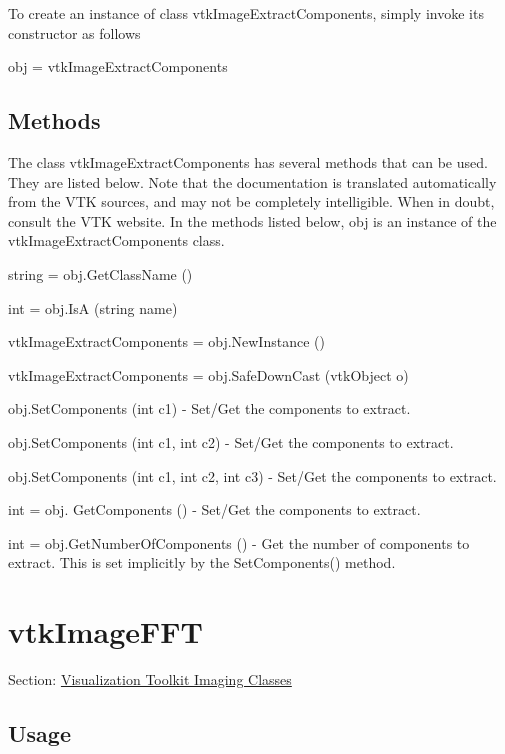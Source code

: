 To create an instance of class vtk\-Image\-Extract\-Components, simply invoke its constructor as follows \begin{DoxyVerb}  obj = vtkImageExtractComponents
\end{DoxyVerb}
 \hypertarget{vtkwidgets_vtkxyplotwidget_Methods}{}\subsection{Methods}\label{vtkwidgets_vtkxyplotwidget_Methods}
The class vtk\-Image\-Extract\-Components has several methods that can be used. They are listed below. Note that the documentation is translated automatically from the V\-T\-K sources, and may not be completely intelligible. When in doubt, consult the V\-T\-K website. In the methods listed below, {\ttfamily obj} is an instance of the vtk\-Image\-Extract\-Components class. 
\begin{DoxyItemize}
\item {\ttfamily string = obj.\-Get\-Class\-Name ()}  
\item {\ttfamily int = obj.\-Is\-A (string name)}  
\item {\ttfamily vtk\-Image\-Extract\-Components = obj.\-New\-Instance ()}  
\item {\ttfamily vtk\-Image\-Extract\-Components = obj.\-Safe\-Down\-Cast (vtk\-Object o)}  
\item {\ttfamily obj.\-Set\-Components (int c1)} -\/ Set/\-Get the components to extract.  
\item {\ttfamily obj.\-Set\-Components (int c1, int c2)} -\/ Set/\-Get the components to extract.  
\item {\ttfamily obj.\-Set\-Components (int c1, int c2, int c3)} -\/ Set/\-Get the components to extract.  
\item {\ttfamily int = obj. Get\-Components ()} -\/ Set/\-Get the components to extract.  
\item {\ttfamily int = obj.\-Get\-Number\-Of\-Components ()} -\/ Get the number of components to extract. This is set implicitly by the Set\-Components() method.  
\end{DoxyItemize}\hypertarget{vtkimaging_vtkimagefft}{}\section{vtk\-Image\-F\-F\-T}\label{vtkimaging_vtkimagefft}
Section\-: \hyperlink{sec_vtkimaging}{Visualization Toolkit Imaging Classes} \hypertarget{vtkwidgets_vtkxyplotwidget_Usage}{}\subsection{Usage}\label{vtkwidgets_vtkxyplotwidget_Usage}
